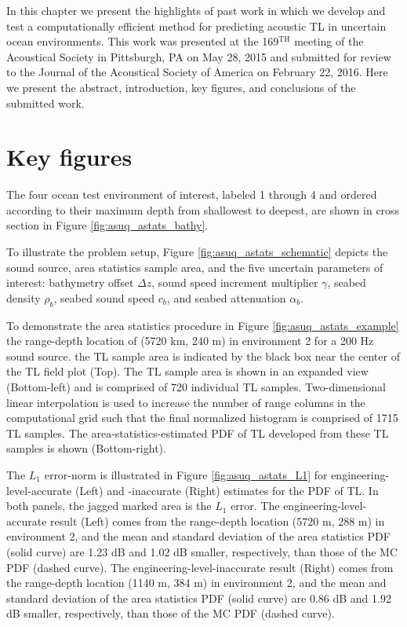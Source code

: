 In this chapter we present the highlights of past work in which we
develop and test a computationally efficient method for predicting
acoustic \ac{TL} in uncertain ocean environments. This work was
presented at the 169$^{\text{TH}}$ meeting of the Acoustical Society
in Pittsburgh, PA on May 28, 2015 \citep{Patterson2015} and submitted
for review to the Journal of the Acoustical Society of America on
February 22, 2016. Here we present the abstract, introduction, key figures, and
conclusions of the submitted work.




\section{Key figures}
The four ocean test environment of interest, labeled 1 through 4 and
ordered according to their maximum depth from shallowest to deepest,
are shown in cross section in Figure \ref{fig:asuq_astats_bathy}.

To illustrate the problem setup, Figure \ref{fig:asuq_astats_schematic}
depicts the sound source, area statistics sample area, and the five
uncertain parameters of interest: bathymetry offset $\Delta z$, sound speed increment
multiplier $\gamma$, seabed density $\rho_b$, seabed sound speed $c_b$, and seabed
attenuation $\alpha_b$.

To demonstrate the area statistics procedure in Figure
\ref{fig:asuq_astats_example} the range-depth location of (5720 km,
240 m) in environment 2 for a 200 Hz sound source. the \ac{TL} sample area
is indicated by the black box near the center of the \ac{TL} field plot
(Top). The \ac{TL} sample area is shown in an expanded view (Bottom-left)
and is comprised of 720 individual \ac{TL} samples.  Two-dimensional linear
interpolation is used to increase the number of range columns in the
computational grid such that the final normalized histogram is
comprised of 1715 \ac{TL} samples. The area-statistics-estimated PDF of \ac{TL}
developed from these \ac{TL} samples is shown (Bottom-right).


The $L_1$ error-norm is illustrated in Figure \ref{fig:asuq_astats_L1}
for engineering-level-accurate (Left) and -inaccurate (Right)
estimates for the \ac{PDF} of \ac{TL}. In both panels, the jagged marked area is
the $L_1$ error. The engineering-level-accurate result (Left) comes from the range-depth
location (5720 m, 288 m) in environment 2, and the mean and standard
deviation of the area statistics \ac{PDF} (solid curve) are 1.23 dB and
1.02 dB smaller, respectively, than those of the \ac{MC} \ac{PDF}
(dashed curve). The engineering-level-inaccurate result (Right) comes from the
range-depth location (1140 m, 384 m) in environment 2, and the mean
and standard deviation of the area statistics \ac{PDF} (solid curve) are
0.86 dB and 1.92 dB smaller, respectively, than those of the
\ac{MC} \ac{PDF} (dashed curve).


